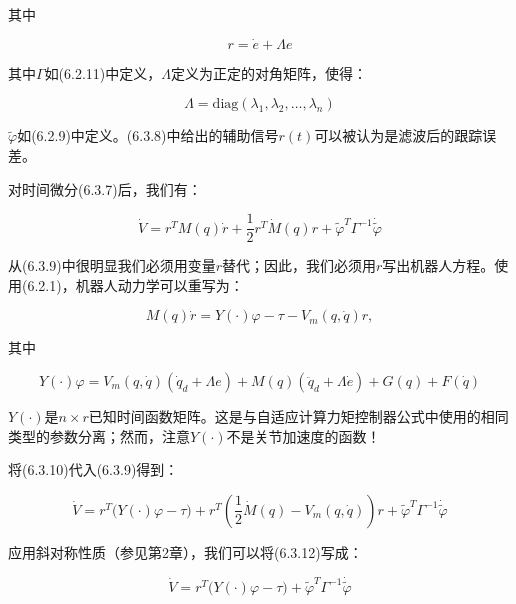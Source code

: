 \documentclass[12pt,a4paper]{ctexart}
\begin{document}
其中

\begin{equation}\label{eq:6.3.8}
r = \dot{e} + \Lambda e
\end{equation}

其中$\Gamma$如(6.2.11)中定义，$\Lambda$定义为正定的对角矩阵，使得：

\begin{equation}\label{eq:6.3.lambda}
\Lambda = \text{diag}(\lambda_1, \lambda_2, \ldots, \lambda_n)
\end{equation}

$\tilde{\varphi}$如(6.2.9)中定义。(6.3.8)中给出的辅助信号$r(t)$可以被认为是滤波后的跟踪误差。

对时间微分(6.3.7)后，我们有：

\begin{equation}\label{eq:6.3.9}
\dot{V} = r^T M(q)\dot{r} + \frac{1}{2}r^T \dot{M}(q)r + \tilde{\varphi}^T \Gamma^{-1} \dot{\tilde{\varphi}}
\end{equation}

从(6.3.9)中很明显我们必须用变量$r$替代；因此，我们必须用$r$写出机器人方程。使用(6.2.1)，机器人动力学可以重写为：

\begin{equation}\label{eq:6.3.10}
M(q)\dot{r} = Y(\cdot)\varphi - \tau - V_m(q, \dot{q})r,
\end{equation}

其中

\begin{equation}\label{eq:6.3.11}
Y(\cdot)\varphi = V_m(q, \dot{q})(\dot{q}_d + \Lambda e) + M(q)(\ddot{q}_d + \Lambda \dot{e}) + G(q) + F(\dot{q})
\end{equation}

$Y(\cdot)$是$n \times r$已知时间函数矩阵。这是与自适应计算力矩控制器公式中使用的相同类型的参数分离；然而，注意$Y(\cdot)$不是关节加速度的函数！

将(6.3.10)代入(6.3.9)得到：

\begin{equation}\label{eq:6.3.12}
\dot{V} = r^T \bigl(Y(\cdot)\varphi - \tau\bigr) + r^T \left( \frac{1}{2}\dot{M}(q) - V_m(q, \dot{q}) \right) r + \tilde{\varphi}^T \Gamma^{-1} \dot{\tilde{\varphi}}
\end{equation}

应用斜对称性质（参见第2章），我们可以将(6.3.12)写成：

\begin{equation}\label{eq:6.3.13}
\dot{V} = r^T \bigl(Y(\cdot)\varphi - \tau\bigr) + \tilde{\varphi}^T \Gamma^{-1} \dot{\tilde{\varphi}}
\end{equation}
\end{document}
